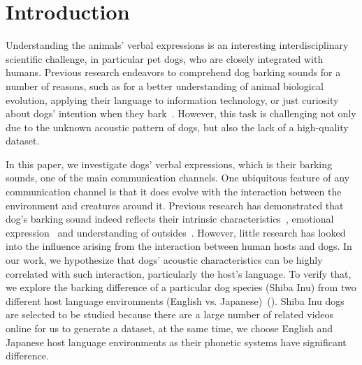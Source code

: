 \section{Introduction}
\label{sec:intro}

Understanding the animals' verbal expressions is an interesting interdisciplinary scientific challenge, 
in particular pet dogs, who are closely integrated with humans. 
Previous research endeavors to comprehend dog barking sounds for a number of reasons, such as for a better understanding of animal biological evolution\cite{pongracz2017modeling}, applying their language to information technology, or just curiosity about dogs' intention when they bark~\cite{pongracz2011children,dogbark_1}. However, this task is challenging not only due to the unknown acoustic pattern of dogs, but also the lack of a high-quality dataset.

In this paper, we investigate dogs' verbal expressions, which is their barking sounds, one of the main communication channels. 
One ubiquitous feature of any communication channel is that it does evolve with the interaction 
between the environment and creatures around it\cite{arnold2018affect}. 
Previous research has demonstrated that dog's barking sound indeed reflects their intrinsic characteristics~\cite{pongracz2010barking,larranaga2015comparing}, emotional expression~\cite{thorndike2017animal,hantke2018my,paladini2020bark} and understanding of outsides~\cite{larranaga2015comparing, molnar2008classification}. 
However, little research has looked into the influence arising from the interaction between human hosts and dogs. 
In our work, we hypothesize that dogs' acoustic characteristics can be highly correlated with such interaction, particularly 
the host's language. 
To verify that, we explore the barking difference of a particular dog species (Shiba Inu) from 
two different host language environments (English vs. Japanese)~(). Shiba Inu dogs are selected to be studied because there are a large number of related videos online for us to generate a dataset, at the same time, we choose English and Japanese host language environments as their phonetic systems have significant difference.%

